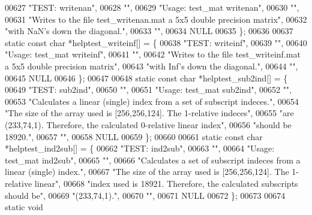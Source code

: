 \begin{DoxyCode}
{{00627     \textcolor{stringliteral}{"TEST: writenan"},
00628     \textcolor{stringliteral}{""},
00629     \textcolor{stringliteral}{"Usage: test\_mat writenan"},
00630     \textcolor{stringliteral}{""},
00631     \textcolor{stringliteral}{"Writes to the file test\_writenan.mat a 5x5 double precision matrix"},
00632     \textcolor{stringliteral}{"with NaN's down the diagonal."},
00633     \textcolor{stringliteral}{""},
00634     NULL
00635 \};
00636 
00637 \textcolor{keyword}{static} \textcolor{keyword}{const} \textcolor{keywordtype}{char} *helptest\_writeinf[] = \{
00638     \textcolor{stringliteral}{"TEST: writeinf"},
00639     \textcolor{stringliteral}{""},
00640     \textcolor{stringliteral}{"Usage: test\_mat writeinf"},
00641     \textcolor{stringliteral}{""},
00642     \textcolor{stringliteral}{"Writes to the file test\_writeinf.mat a 5x5 double precision matrix"},
00643     \textcolor{stringliteral}{"with Inf's down the diagonal."},
00644     \textcolor{stringliteral}{""},
00645     NULL
00646 \};
00647 
00648 \textcolor{keyword}{static} \textcolor{keyword}{const} \textcolor{keywordtype}{char} *helptest\_sub2ind[] = \{
00649     \textcolor{stringliteral}{"TEST: sub2ind"},
00650     \textcolor{stringliteral}{""},
00651     \textcolor{stringliteral}{"Usage: test\_mat sub2ind"},
00652     \textcolor{stringliteral}{""},
00653     \textcolor{stringliteral}{"Calculates a linear (single) index from a set of subscript indeces."},
00654     \textcolor{stringliteral}{"The size of the array used is [256,256,124].  The 1-relative indeces"},
00655     \textcolor{stringliteral}{"are (233,74,1).  Therefore, the calculated 0-relative linear index"},
00656     \textcolor{stringliteral}{"should be 18920."},
00657     \textcolor{stringliteral}{""},
00658     NULL
00659 \};
00660 
00661 \textcolor{keyword}{static} \textcolor{keyword}{const} \textcolor{keywordtype}{char} *helptest\_ind2sub[] = \{
00662     \textcolor{stringliteral}{"TEST: ind2sub"},
00663     \textcolor{stringliteral}{""},
00664     \textcolor{stringliteral}{"Usage: test\_mat ind2sub"},
00665     \textcolor{stringliteral}{""},
00666     \textcolor{stringliteral}{"Calculates a set of subscript indeces from a linear (single) index."},
00667     \textcolor{stringliteral}{"The size of the array used is [256,256,124].  The 1-relative linear"},
00668     \textcolor{stringliteral}{"index used is 18921.  Therefore, the calculated subscripts should be"},
00669     \textcolor{stringliteral}{"(233,74,1)."},
00670     \textcolor{stringliteral}{""},
00671     NULL
00672 \};
00673 
00674 \textcolor{keyword}{static} \textcolor{keywordtype}{void}
}}
\end{DoxyCode}
